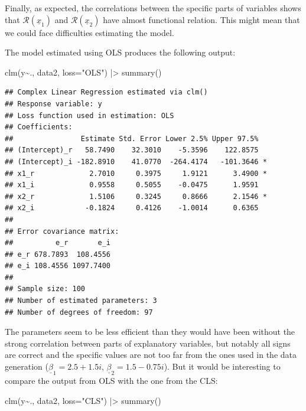 \documentclass[
]{book}
\newenvironment{Shaded}{\begin{snugshade}}{\end{snugshade}}
\newcommand{\AttributeTok}[1]{\textcolor[rgb]{0.77,0.63,0.00}{#1}}
\newcommand{\FunctionTok}[1]{\textcolor[rgb]{0.00,0.00,0.00}{#1}}
\newcommand{\NormalTok}[1]{#1}
\newcommand{\SpecialCharTok}[1]{\textcolor[rgb]{0.00,0.00,0.00}{#1}}
\newcommand{\StringTok}[1]{\textcolor[rgb]{0.31,0.60,0.02}{#1}}
\begin{document}
Finally, as expected, the correlations between the specific parts of variables shows that \(\mathcal{R}\left(\underline{x}_1\right)\) and \(\mathcal{R}\left(\underline{x}_2\right)\) have almost functional relation. This might mean that we could face difficulties estimating the model.

The model estimated using OLS produces the following output:

\begin{Shaded}
\begin{Highlighting}[]
\FunctionTok{clm}\NormalTok{(y}\SpecialCharTok{\textasciitilde{}}\NormalTok{., data2, }\AttributeTok{loss=}\StringTok{"OLS"}\NormalTok{) }\SpecialCharTok{|\textgreater{}}
    \FunctionTok{summary}\NormalTok{()}
\end{Highlighting}
\end{Shaded}

\begin{verbatim}
## Complex Linear Regression estimated via clm()
## Response variable: y
## Loss function used in estimation: OLS
## Coefficients:
##                Estimate Std. Error Lower 2.5% Upper 97.5%  
## (Intercept)_r   58.7490    32.3010    -5.3596    122.8575  
## (Intercept)_i -182.8910    41.0770  -264.4174   -101.3646 *
## x1_r             2.7010     0.3975     1.9121      3.4900 *
## x1_i             0.9558     0.5055    -0.0475      1.9591  
## x2_r             1.5106     0.3245     0.8666      2.1546 *
## x2_i            -0.1824     0.4126    -1.0014      0.6365  
## 
## Error covariance matrix:
##          e_r       e_i
## e_r 678.7893  108.4556
## e_i 108.4556 1097.7400
## 
## Sample size: 100
## Number of estimated parameters: 3
## Number of degrees of freedom: 97
\end{verbatim}

The parameters seem to be less efficient than they would have been without the strong correlation between parts of explanatory variables, but notably all signs are correct and the specific values are not too far from the ones used in the data generation (\(\underline{\beta}_1=2.5+1.5i\), \(\underline{\beta}_2=1.5-0.75i\)). But it would be interesting to compare the output from OLS with the one from the CLS:

\begin{Shaded}
\begin{Highlighting}[]
\FunctionTok{clm}\NormalTok{(y}\SpecialCharTok{\textasciitilde{}}\NormalTok{., data2, }\AttributeTok{loss=}\StringTok{"CLS"}\NormalTok{) }\SpecialCharTok{|\textgreater{}}
    \FunctionTok{summary}\NormalTok{()}
\end{Highlighting}
\end{Shaded}
\end{document}
